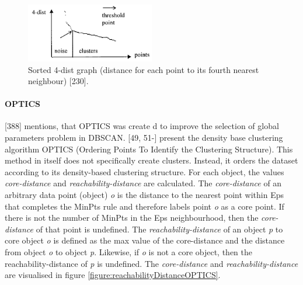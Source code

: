\begin{figure}[h]
  \centering
  \includegraphics[width=0.5\textwidth]{./images/sortedKGraphDBSCAN.png}
  \caption{Sorted 4-dist graph (distance for each point to its fourth nearest neighbour) \autocite{DBSCAN}[230].}
  \label{figure:sortedKGraphDBSCAN}
\end{figure}




\paragraph{OPTICS}
\label{section:OPTICS}
\textcite{han2011data}[388] mentions, that OPTICS was create d to improve the selection of global parameters problem in DBSCAN.
\textcite{OPTICS}[49, 51-] present the density base clustering algorithm OPTICS (Ordering Points To Identify the Clustering Structure). This method in itself does not specifically create clusters. Instead, it orders the dataset according to its density-based clustering structure. For each object, the values \textit{core-distance} and \textit{reachability-distance} are calculated. The \textit{core-distance} of an arbitrary data point (object) \textit{o} is the distance to the nearest point within Eps that completes the MinPts rule and therefore labels point \textit{o} as a core point. If there is not the number of MinPts in the Eps neighbourhood, then the \textit{core-distance} of that point is undefined. The \textit{reachability-distance} of an object \textit{p} to core object \textit{o}  is defined as the max value of the core-distance and the distance from object \textit{o} to object \textit{p}. Likewise, if \textit{o} is not a core object, then the {reachability-distance} of \textit{p} is undefined. The \textit{core-distance} and \textit{reachability-distance} are visualised in figure \ref{figure:reachabilityDistanceOPTICS}.

